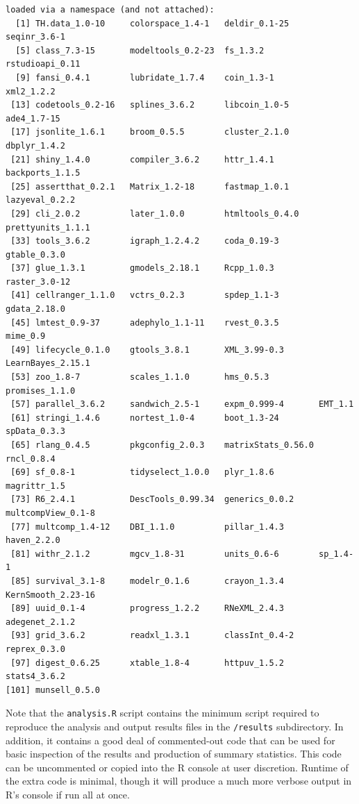 \begin{verbatim}
loaded via a namespace (and not attached):
  [1] TH.data_1.0-10     colorspace_1.4-1   deldir_0.1-25      seqinr_3.6-1      
  [5] class_7.3-15       modeltools_0.2-23  fs_1.3.2           rstudioapi_0.11   
  [9] fansi_0.4.1        lubridate_1.7.4    coin_1.3-1         xml2_1.2.2        
 [13] codetools_0.2-16   splines_3.6.2      libcoin_1.0-5      ade4_1.7-15       
 [17] jsonlite_1.6.1     broom_0.5.5        cluster_2.1.0      dbplyr_1.4.2      
 [21] shiny_1.4.0        compiler_3.6.2     httr_1.4.1         backports_1.1.5   
 [25] assertthat_0.2.1   Matrix_1.2-18      fastmap_1.0.1      lazyeval_0.2.2    
 [29] cli_2.0.2          later_1.0.0        htmltools_0.4.0    prettyunits_1.1.1 
 [33] tools_3.6.2        igraph_1.2.4.2     coda_0.19-3        gtable_0.3.0      
 [37] glue_1.3.1         gmodels_2.18.1     Rcpp_1.0.3         raster_3.0-12     
 [41] cellranger_1.1.0   vctrs_0.2.3        spdep_1.1-3        gdata_2.18.0      
 [45] lmtest_0.9-37      adephylo_1.1-11    rvest_0.3.5        mime_0.9          
 [49] lifecycle_0.1.0    gtools_3.8.1       XML_3.99-0.3       LearnBayes_2.15.1 
 [53] zoo_1.8-7          scales_1.1.0       hms_0.5.3          promises_1.1.0    
 [57] parallel_3.6.2     sandwich_2.5-1     expm_0.999-4       EMT_1.1           
 [61] stringi_1.4.6      nortest_1.0-4      boot_1.3-24        spData_0.3.3      
 [65] rlang_0.4.5        pkgconfig_2.0.3    matrixStats_0.56.0 rncl_0.8.4        
 [69] sf_0.8-1           tidyselect_1.0.0   plyr_1.8.6         magrittr_1.5      
 [73] R6_2.4.1           DescTools_0.99.34  generics_0.0.2     multcompView_0.1-8
 [77] multcomp_1.4-12    DBI_1.1.0          pillar_1.4.3       haven_2.2.0       
 [81] withr_2.1.2        mgcv_1.8-31        units_0.6-6        sp_1.4-1          
 [85] survival_3.1-8     modelr_0.1.6       crayon_1.3.4       KernSmooth_2.23-16
 [89] uuid_0.1-4         progress_1.2.2     RNeXML_2.4.3       adegenet_2.1.2    
 [93] grid_3.6.2         readxl_1.3.1       classInt_0.4-2     reprex_0.3.0      
 [97] digest_0.6.25      xtable_1.8-4       httpuv_1.5.2       stats4_3.6.2      
[101] munsell_0.5.0       
\end{verbatim}

Note that the \texttt{analysis.R} script contains the minimum script
required to reproduce the analysis and output results files in the
\texttt{/results} subdirectory. In addition, it contains a good deal of
commented-out code that can be used for basic inspection of the results
and production of summary statistics. This code can be uncommented or
copied into the R console at user discretion. Runtime of the extra code
is minimal, though it will produce a much more verbose output in R's
console if run all at once.

